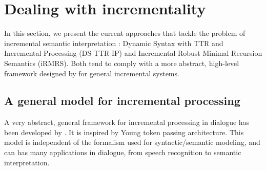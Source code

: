 \documentclass[11pt]{article}
\begin{document}
	\section{Dealing with incrementality}
		In this section, we present the current approaches that tackle the problem of incremental semantic interpretation : Dynamic Syntax with TTR and Incremental Processing (DS-TTR IP) and Incremental Robust Minimal Recursion Semantics (iRMRS). Both tend to comply with a more abstract, high-level framework designed by \cite{schlangen2009} for general incremental systems.
		\subsection{A general model for incremental processing}\label{iu_model}
			A very abstract, general framework for incremental processing in dialogue has been developed by \cite{schlangen2009}. It is inspired by Young token passing architecture. This model is independent of the formalism used for syntactic/semantic modeling, and can has many applications in dialogue, from speech recognition to semantic interpretation.\\
			
\end{document}
